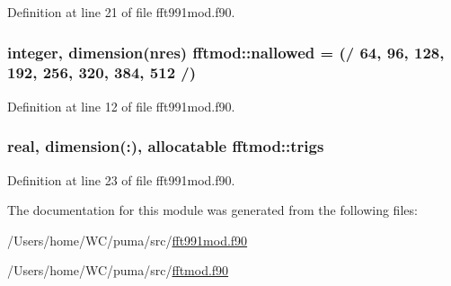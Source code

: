 \-Definition at line 21 of file fft991mod.\-f90.

\hypertarget{classfftmod_a6d025a16cb8a864a12a875409fa6cc5b}{
\subsubsection[{nallowed}]{\setlength{\rightskip}{0pt plus 5cm}integer, dimension(nres) {\bf fftmod\-::nallowed} = (/ 64, 96, 128, 192, 256, 320, 384, 512 /)}}
\label{classfftmod_a6d025a16cb8a864a12a875409fa6cc5b}


\-Definition at line 12 of file fft991mod.\-f90.

\hypertarget{classfftmod_ab67bfe78645c286a8d39d9b8fd10ce0a}{
\subsubsection[{trigs}]{\setlength{\rightskip}{0pt plus 5cm}real, dimension(\-:), allocatable {\bf fftmod\-::trigs}}}
\label{classfftmod_ab67bfe78645c286a8d39d9b8fd10ce0a}


\-Definition at line 23 of file fft991mod.\-f90.



\-The documentation for this module was generated from the following files\-:\begin{DoxyCompactItemize}
\item 
/\-Users/home/\-W\-C/puma/src/\hyperlink{fft991mod_8f90}{fft991mod.\-f90}\item 
/\-Users/home/\-W\-C/puma/src/\hyperlink{fftmod_8f90}{fftmod.\-f90}\end{DoxyCompactItemize}
